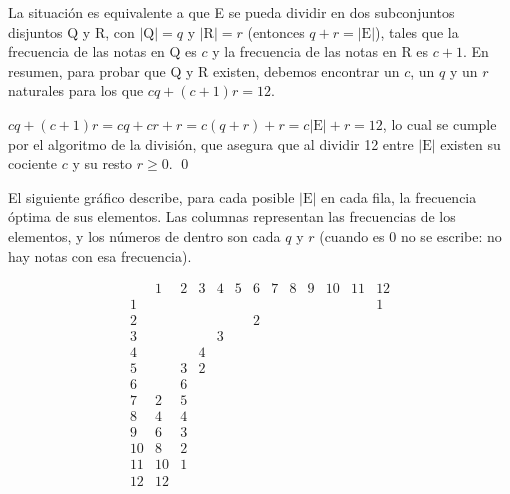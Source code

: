 		La situación es equivalente a que E se pueda dividir en dos subconjuntos disjuntos Q y R, con $|\text{Q}|=q$ y $|\text{R}|=r$ (entonces $q+r=|\text{E}|$), tales que la frecuencia de las notas en Q es $c$ y la frecuencia de las notas en R es $c+1$. En resumen, para probar que Q y R existen, debemos encontrar un $c$, un $q$ y un $r$ naturales para los que $cq + (c+1)r=12$.
		
		$cq + (c+1)r =
		cq + cr + r =
		c(q+r) + r =
		c|\text{E}| + r = 12$, lo cual se cumple por el algoritmo de la división, que asegura que al dividir 12 entre $|\text{E}|$ existen su cociente $c$ y su resto $r\geq0$. \qed
		
		El siguiente gráfico describe, para cada posible $|\text{E}|$ en cada fila, la frecuencia óptima de sus elementos. Las columnas representan las frecuencias de los elementos, y los números de dentro son cada $q$ y $r$ (cuando es 0 no se escribe: no hay notas con esa frecuencia).
		
		
%			
%			
%			
	
		\[\begin{array}{l|rrrrrrrrrrrr}
		&1&2&3&4&5&6&7&8&9&10&11&12\\\hline
		1&&&&&&&&&&&&1\\\hline
		2&&&&&&2\\\hline
		3&&&&3\\\hline
		4&&&4\\\hline
		5&&3&2\\\hline
		6&&6\\\hline
		7&2&5\\\hline
		8&4&4\\\hline
		9&6&3\\\hline
		10&8&2\\\hline
		11&10&1\\\hline
		12&12&\\
		\end{array}\]
		
